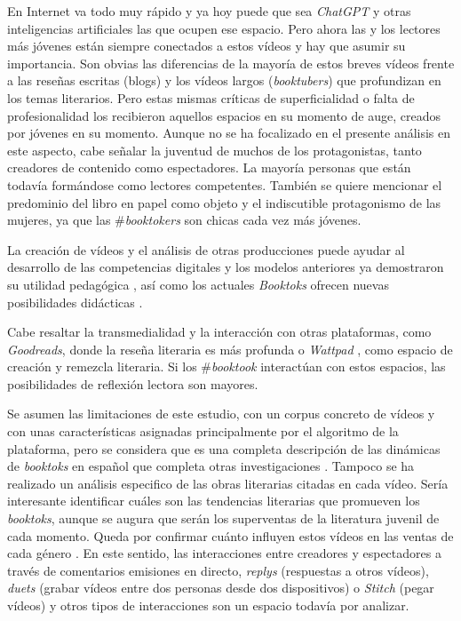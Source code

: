 En Internet va todo muy rápido y ya hoy puede que sea \emph{ChatGPT} y
otras inteligencias artificiales las que ocupen ese espacio. Pero ahora
las y los lectores más jóvenes están siempre conectados a estos vídeos y
hay que asumir su importancia. Son obvias las diferencias de la mayoría
de estos breves vídeos frente a las reseñas escritas (blogs) y los
vídeos largos (\emph{booktubers}) que profundizan en los temas
literarios. Pero estas mismas críticas de superficialidad o falta de
profesionalidad los recibieron aquellos espacios en su momento de auge,
creados por jóvenes en su momento. Aunque no se ha focalizado en el
presente análisis en este aspecto, cabe señalar la juventud de muchos de
los protagonistas, tanto creadores de contenido como espectadores. La
mayoría personas que están todavía formándose como lectores competentes.
También se quiere mencionar el predominio del libro en papel como objeto
y el indiscutible protagonismo de las mujeres, ya que las
\#\emph{booktokers} son chicas cada vez más jóvenes.

La creación de vídeos y el análisis de otras producciones puede ayudar
al desarrollo de las competencias digitales \cite{allué2023} y los
modelos anteriores ya demostraron su utilidad pedagógica \cite{paladines_Paredes_Aliagas_Marín_2021}, así como los actuales \emph{Booktoks} ofrecen nuevas
posibilidades didácticas \cite{dezuanni2021,acevedo2022}.

Cabe resaltar la transmedialidad y la interacción con otras plataformas,
como \emph{Goodreads}, donde la reseña literaria es más profunda
\cite{sanchez-garcia2021} o \emph{Wattpad} \cite{garciaroca2019},
como espacio de creación y remezcla literaria. Si los \#\emph{booktook}
interactúan con estos espacios, las posibilidades de reflexión lectora
son mayores.

Se asumen las limitaciones de este estudio, con un corpus concreto de
vídeos y con unas características asignadas principalmente por el
algoritmo de la plataforma, pero se considera que es una completa
descripción de las dinámicas de \emph{booktoks} en español que completa
otras investigaciones \cite{guinez-cabara2022}. Tampoco
se ha realizado un análisis especifico de las obras literarias citadas
en cada vídeo. Sería interesante identificar cuáles son las tendencias
literarias que promueven los \emph{booktoks}, aunque se augura que serán
los superventas de la literatura juvenil de cada momento. Queda por
confirmar cuánto influyen estos vídeos en las ventas de cada género
\cite{merga2021,martens2022}. En este sentido, las
interacciones entre creadores y espectadores a través de comentarios
emisiones en directo, \emph{replys} (respuestas a otros vídeos),
\emph{duets} (grabar vídeos entre dos personas desde dos dispositivos) o
\emph{Stitch} (pegar vídeos) y otros tipos de interacciones son un
espacio todavía por analizar.

